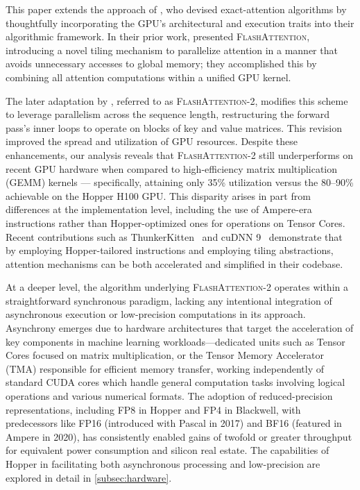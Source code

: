 This paper extends the approach of \citet{dao2022flashattention}, who devised exact-attention algorithms by thoughtfully incorporating the GPU’s architectural and execution traits into their algorithmic framework. In their prior work, \citet{dao2022flashattention} presented \textsc{FlashAttention}, introducing a novel tiling mechanism to parallelize attention in a manner that avoids unnecessary accesses to global memory; they accomplished this by combining all attention computations within a unified GPU kernel.

The later adaptation by \citet{dao2023flashattention2}, referred to as \textsc{FlashAttention-2}, modifies this scheme to leverage parallelism across the sequence length, restructuring the forward pass’s inner loops to operate on blocks of key and value matrices. This revision improved the spread and utilization of GPU resources. Despite these enhancements, our analysis reveals that \textsc{FlashAttention-2} still underperforms on recent GPU hardware when compared to high-efficiency matrix multiplication (GEMM) kernels — specifically, attaining only 35\% utilization versus the 80–90\% achievable on the Hopper H100 GPU. This disparity arises in part from differences at the implementation level, including the use of Ampere-era instructions rather than Hopper-optimized ones for operations on Tensor Cores. Recent contributions such as ThunkerKitten~\citep{spector2024thunder} and cuDNN 9~\citep{cudnn9} demonstrate that by employing Hopper-tailored instructions and employing tiling abstractions, attention mechanisms can be both accelerated and simplified in their codebase.

At a deeper level, the algorithm underlying \textsc{FlashAttention-2} operates within a straightforward synchronous paradigm, lacking any intentional integration of asynchronous execution or low-precision computations in its approach. Asynchrony emerges due to hardware architectures that target the acceleration of key components in machine learning workloads—dedicated units such as Tensor Cores focused on matrix multiplication, or the Tensor Memory Accelerator (TMA) responsible for efficient memory transfer, working independently of standard CUDA cores which handle general computation tasks involving logical operations and various numerical formats. The adoption of reduced-precision representations, including FP8 in Hopper and FP4 in Blackwell, with predecessors like FP16 (introduced with Pascal in 2017) and BF16 (featured in Ampere in 2020), has consistently enabled gains of twofold or greater throughput for equivalent power consumption and silicon real estate. The capabilities of Hopper in facilitating both asynchronous processing and low-precision are explored in detail in \cref{subsec:hardware}.

